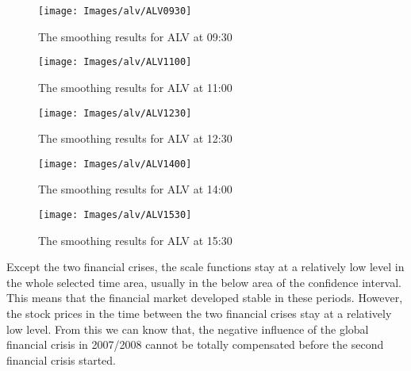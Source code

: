\begin{figure}[!htbp]
	\centering
	\texttt{[image: Images/alv/ALV0930]}
	\caption[The smoothing results for ALV at 09:30]{The smoothing results for ALV at 09:30}
	\label{fig:ALV0930}
\end{figure}


\begin{figure}[!htbp]
	\centering
	\texttt{[image: Images/alv/ALV1100]}
	\caption[The smoothing results for ALV at 11:00]{The smoothing results for ALV at 11:00}
	\label{fig:ALV1100}
\end{figure}

\begin{figure}[!htbp]
	\centering
	\texttt{[image: Images/alv/ALV1230]}
	\caption[The smoothing results for ALV at 12:30]{The smoothing results for ALV at 12:30}
	\label{fig:ALV1230}
\end{figure}

\begin{figure}[!htbp]
	\centering
	\texttt{[image: Images/alv/ALV1400]}
	\caption[The smoothing results for ALV at 14:00]{The smoothing results for ALV at 14:00}
	\label{fig:ALV1400}
\end{figure}

\begin{figure}[!htbp]
	\centering
	\texttt{[image: Images/alv/ALV1530]}
	\caption[The smoothing results for ALV at 15:30]{The smoothing results for ALV at 15:30}
	\label{fig:ALV1530}
\end{figure}

Except the two financial crises, the scale functions stay at a relatively low level in the whole selected time area, usually in the below area of the confidence interval. This means that the financial market developed stable in these periods. However, the stock prices in the time between the two financial crises stay at a relatively low level. From this we can know that, the negative influence of the global financial crisis in 2007/2008 cannot be totally compensated before the second financial crisis started. 

